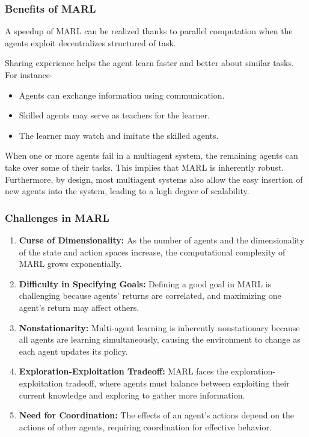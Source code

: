 \documentclass{beamer}
\begin{document}
\begin{frame}
\frametitle{Benefits of MARL}
A speedup of MARL can be realized thanks to parallel computation when the agents exploit decentralizes structured of task.\vspace{10pt}

Sharing experience helps the agent learn faster and better about similar tasks. For instance-
\begin{itemize}
\item Agents can exchange information using communication.
\item Skilled agents may serve as teachers for the learner.
\item The learner may watch and imitate the skilled agents.
\end{itemize}
\vspace{10pt}
When one or more agents fail in a multiagent system, the
remaining agents can take over some of their tasks. This implies
that MARL is inherently robust. Furthermore, by design, most
multiagent systems also allow the easy insertion of new agents
into the system, leading to a high degree of scalability.
\end{frame}

\begin{frame}
\frametitle{Challenges in MARL}
\begin{enumerate}
\item \textbf{Curse of Dimensionality:} As the number of agents and the dimensionality of the state and action spaces increase, the computational complexity of MARL grows exponentially.
\item \textbf{Difficulty in Specifying Goals:} Defining a good goal in MARL is challenging because agents' returns are correlated, and maximizing one agent's return may affect others.
\item \textbf{Nonstationarity:} Multi-agent learning is inherently nonstationary because all agents are learning simultaneously, causing the environment to change as each agent updates its policy.
\item \textbf{Exploration-Exploitation Tradeoff:}  MARL faces the exploration-exploitation tradeoff, where agents must balance between exploiting their current knowledge and exploring to gather more information.
\item \textbf{Need for Coordination:} The effects of an agent's actions depend on the actions of other agents, requiring coordination for effective behavior.
\end{enumerate}
\end{frame}
\end{document}
